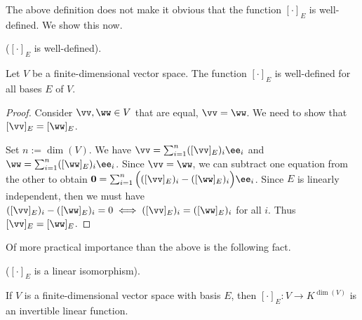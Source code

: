 The above definition does not make it obvious that the function $[\cdot]_E$ is well-defined. We show this now.

\begin{theorem}
    ($[\cdot]_E$ is well-defined).

    Let $V$ be a finite-dimensional vector space. The function $[\cdot]_E$ is well-defined for all bases $E$ of $V$.
\end{theorem}

\begin{proof}
    Consider $\vv, \ww \in V$ that are equal, $\vv = \ww$. We need to show that $[\vv]_E = [\ww]_E$.
    
    Set $n := \dim(V)$. We have $\vv = \sum_{i = 1}^n ([\vv]_E)_i \ee_i$ and $\ww = \sum_{i = 1}^n ([\ww]_E)_i \ee_i$. Since $\vv = \ww$, we can subtract one equation from the other to obtain $\mathbf{0} = \sum_{i = 1}^n \Big(([\vv]_E)_i - ([\ww]_E)_i\Big) \ee_i$. Since $E$ is linearly independent, then we must have $([\vv]_E)_i - ([\ww]_E)_i = 0 \iff ([\vv]_E)_i = ([\ww]_E)_i$ for all $i$. Thus $[\vv]_E = [\ww]_E$.
\end{proof}

Of more practical importance than the above is the following fact.

\begin{theorem}
\label{ch::lin_alg::thm::[]E_invertible}
    ($[\cdot]_E$ is a linear isomorphism).
    
    If $V$ is a finite-dimensional vector space with basis $E$, then $[\cdot]_E:V \rightarrow K^{\dim(V)}$ is an invertible linear function.
\end{theorem}

